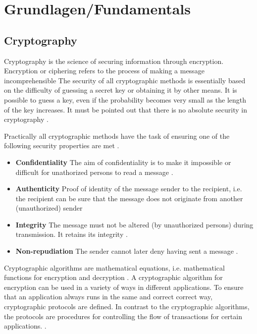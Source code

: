 \chapter{Grundlagen/Fundamentals}
\section{Cryptography}

Cryptography is the science of securing information through encryption. Encryption or ciphering refers to the process of making a message incomprehensible \cite[18]{crypto} The security of all cryptographic methods is essentially based on the difficulty of guessing a secret key or obtaining it by other means. It is possible to guess a key, even if the probability becomes very small as the length of the key increases. It must be pointed out that there is no absolute security in cryptography \cite[25]{crypto}.

Practically all cryptographic methods have the task of ensuring one of the following security properties are met \cite[18]{crypto}. 
\begin{itemize}
    \item \textbf{Confidentiality} The aim of confidentiality is to make it impossible or difficult for unathorized persons to read a message \cite[18]{crypto}.
    \item \textbf{Authenticity} Proof of identity of the message sender to the recipient, i.e. the recipient can be sure that the message does not originate from another (unauthorized) sender \cite[18]{crypto}
    \item \textbf{Integrity} The message must not be altered (by unauthorized persons) during transmission. It retains its integrity \cite[18]{crypto}.
    \item \textbf{Non-repudiation} The sender cannot later deny having sent a message \cite[18]{crypto}.
\end{itemize}

Cryptographic algorithms are mathematical equations, i.e. mathematical functions for encryption and decryption \cite[19]{crypto}. A cryptographic algorithm for encryption can be used in a variety of ways in different applications. To ensure that an application always runs in the same and correct correct way, cryptographic protocols are defined. In contrast to the cryptographic algorithms, the protocols are procedures for controlling the flow of transactions for certain applications. \cite[22]{crypto}.

